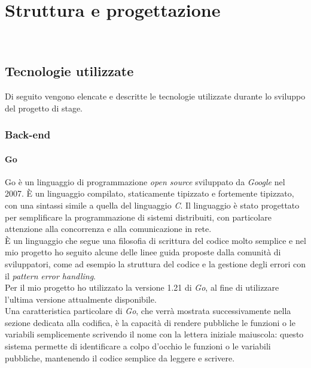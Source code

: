 \chapter{Struttura e progettazione}
\label{cap:struttura-progettazione}

\\

\section{Tecnologie utilizzate}

Di seguito vengono elencate e descritte le tecnologie utilizzate durante lo sviluppo del
progetto di stage.

\subsection{Back-end}

\subsubsection*{Go}

Go è un linguaggio di programmazione \emph{open source} sviluppato da
\emph{Google} nel 2007. È un linguaggio compilato, staticamente tipizzato e
fortemente tipizzato, con una sintassi simile a quella del linguaggio \emph{C}.
Il linguaggio è stato progettato per semplificare la programmazione di sistemi
distribuiti, con particolare attenzione alla concorrenza e alla
comunicazione in rete. \\
È un linguaggio che segue una filosofia di scrittura del codice molto semplice e
nel mio progetto ho seguito alcune delle linee guida proposte dalla comunità di
sviluppatori, come ad esempio la struttura del codice e la gestione degli errori
con il \emph{pattern} \emph{error handling}. \\
Per il mio progetto ho utilizzato la versione 1.21 di \emph{Go}, al fine di
utilizzare l'ultima versione attualmente disponibile.\\
Una caratteristica particolare di \emph{Go}, che verrà mostrata successivamente
nella sezione dedicata alla codifica, è la capacità di rendere pubbliche le
funzioni o le variabili semplicemente scrivendo il nome con la lettera iniziale
maiuscola: questo sistema permette di identificare a colpo d'occhio le funzioni
o le variabili pubbliche, mantenendo il codice semplice da leggere e scrivere. \cite{go}

